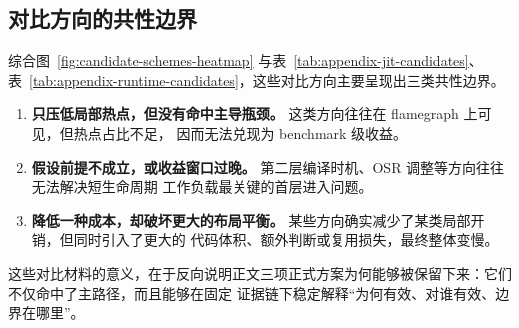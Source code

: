 \subsection{对比方向的共性边界}

综合图~\ref{fig:candidate-schemes-heatmap} 与表~\ref{tab:appendix-jit-candidates}、
表~\ref{tab:appendix-runtime-candidates}，这些对比方向主要呈现出三类共性边界。

\begin{enumerate}
    \item \textbf{只压低局部热点，但没有命中主导瓶颈。} 这类方向往往在 flamegraph 上可见，但热点占比不足，
    因而无法兑现为 benchmark 级收益。
    \item \textbf{假设前提不成立，或收益窗口过晚。} 第二层编译时机、OSR 调整等方向往往无法解决短生命周期
    工作负载最关键的首层进入问题。
    \item \textbf{降低一种成本，却破坏更大的布局平衡。} 某些方向确实减少了某类局部开销，但同时引入了更大的
    代码体积、额外判断或复用损失，最终整体变慢。
\end{enumerate}

这些对比材料的意义，在于反向说明正文三项正式方案为何能够被保留下来：它们不仅命中了主路径，而且能够在固定
证据链下稳定解释“为何有效、对谁有效、边界在哪里”。
